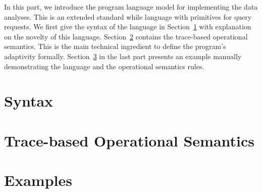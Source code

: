 In this part, 
we introduce the program language model for implementing the data analyses.  
This is an extended standard while language with primitives for query requests.
We first give the syntax of the language in Section~\ref{sec:language-syntax} with
explanation on the novelty of this language.
Section~\ref{sec:language-os} contains the trace-based operational semantics. 
This is the main technical ingredient to define the program's adaptivity formally.
Section~\ref{sec:language-examples} in the last part presents an example manually demonstrating the language and the operational semantics
rules.

\section{Syntax}
\label{sec:language-syntax}


\section{Trace-based Operational Semantics}
\label{sec:language-os}


\section{Examples}
\label{sec:language-examples}

